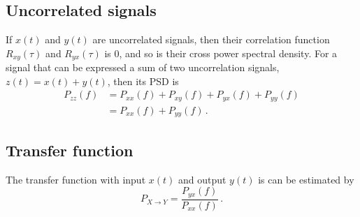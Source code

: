 \subsection{Uncorrelated signals}
If $x(t)$ and $y(t)$ are uncorrelated signals, then their correlation function $R_{xy}(\tau)$ and $R_{yx}(\tau)$ is 0, and so is their cross power spectral density.
For a signal that can be expressed a sum of two uncorrelation signals, $z(t)=x(t)+y(t)$, then its PSD is
\begin{equation}
	\begin{split}
		P_{zz}(f) &= P_{xx}(f) + P_{xy}(f) + P_{yx}(f) + P_{yy}(f)\\
		&= P_{xx}(f) + P_{yy}(f)\,.
	\end{split}
\end{equation}

\subsection{Transfer function}
The transfer function with input $x(t)$ and output $y(t)$ is can be estimated by
\begin{equation}
	P_{X\to Y} = \frac{P_{yx}(f)}{P_{xx}(f)}\,.
\end{equation}